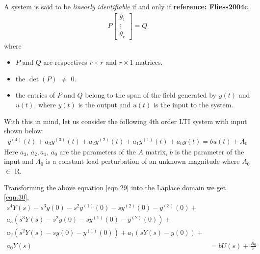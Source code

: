 \documentclass{article}
\begin{document}
\par A system is said to be \textit{linearly identifiable} if and only if \textbf{reference: Fliess2004c}, 
\begin{equation}\label{eqn.28.1}
\begin{split}
P\begin{bmatrix} \theta_1 \\ \vdots \\ \theta_r \end{bmatrix} = Q
\end{split}
\end{equation}
where
\begin{itemize}
\item $P$ and $Q$ are respectives $r \times r$ and $r \times 1$ matrices.
\item the $\det(P)$ $\neq$ $0$. 
\item the entries of $P$ and $Q$ belong to the span of the field generated by $y(t)$ and $u(t)$, where $y(t)$ is the output and $u(t)$ is the input to the system.
\end{itemize}
With this in mind, let us consider the following 4th order LTI system with input shown below:
\begin{equation}\label{eqn.29}
\begin{split}
y^{(4)}(t)+a_{3}y^{(3)}(t)+a_{2}y^{(2)}(t)+a_{1}y^{(1)}(t)+a_{0}y(t) = b u(t) +A_{0}
\end{split}
\end{equation}
Here $a_{3}$, $a_{2}, a_{1}$, $a_{0}$ are the parameters of the $A$ matrix, $b$ is the parameter of the input and $A_{0}$ is a constant load perturbation of an unknown magnitude where $A_{0}$ $\in$ $\mathrm{R}$.
\par Transforming the above equation \eqref{eqn.29} into the Laplace domain we get \eqref{eqn.30},
\begin{equation}\label{eqn.30}
\begin{split}
s^4Y(s) - s^3y(0) - s^2y^{(1)}(0) - sy^{(2)}(0) - y^{(3)}(0) + & \\
a_{3}(s^3Y(s) - s^2y(0) - sy^{(1)}(0) - y^{(2)}(0)) + & \\
a_{2}(s^2Y(s) - sy(0) - y^{(1)}(0)) + a_{1}(sY(s)-y(0)) + & \\
a_{0}Y(s) &= b U(s) + \frac{A_{0}}{s}
\end{split}
\end{equation}
\end{document}
